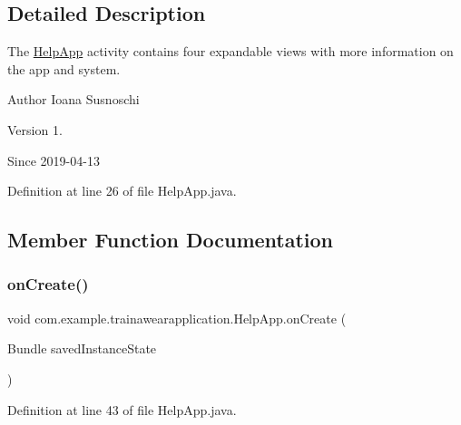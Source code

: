 \subsection{Detailed Description}
The \mbox{\hyperlink{classcom_1_1example_1_1trainawearapplication_1_1_help_app}{Help\+App}} activity contains four expandable views with more information on the app and system. 

\begin{DoxyAuthor}{Author}
Ioana Susnoschi 
\end{DoxyAuthor}
\begin{DoxyVersion}{Version}
1. 
\end{DoxyVersion}
\begin{DoxySince}{Since}
2019-\/04-\/13 
\end{DoxySince}


Definition at line 26 of file Help\+App.\+java.



\subsection{Member Function Documentation}
\mbox{\label{classcom_1_1example_1_1trainawearapplication_1_1_help_app_a8fb144074fe5f839efbbdbfb16edd528}} 
\subsubsection{\texorpdfstring{onCreate()}{onCreate()}}
{\footnotesize\ttfamily void com.\+example.\+trainawearapplication.\+Help\+App.\+on\+Create (\begin{DoxyParamCaption}\item[{Bundle}]{saved\+Instance\+State }\end{DoxyParamCaption})\hspace{0.3cm}{\ttfamily [protected]}}



Definition at line 43 of file Help\+App.\+java.


